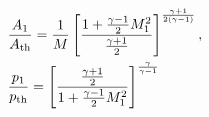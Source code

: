\documentclass[10pt]{article}
\begin{document}
\begin{align*}& \frac{A_{1}}{A_{\rm th}}
=
\frac{1}{M} 
\left[ 
\frac{1+\frac{\gamma-1}{2} M_{1}^{2}}{\frac{\gamma+1}{2}}
\right]^{\frac{\gamma+1}{2 \left( \gamma - 1 \right)}} , 
\\
& \frac{p_{1}}{p_{\rm th}}
=
\left[ 
\frac{\frac{\gamma+1}{2}}{1+\frac{\gamma-1}{2} M_{1}^{2}}
\right]^{\frac{\gamma}{\gamma - 1 } }
\end{align*}
\end{document}
